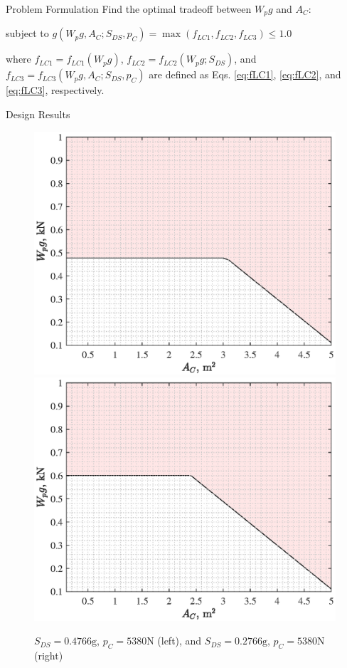 \documentclass[9pt]{beamer}
\begin{document}
	\begin{frame}{Problem Formulation}
	Find the optimal tradeoff between $W_pg$ and $A_C$:
	
	subject to $g(W_pg,A_C;S_{DS},p_C)=\max(f_{LC1},f_{LC2},f_{LC3})\leq 1.0$
	
	\noindent where $f_{LC1}=f_{LC1}(W_pg)$, $f_{LC2}=f_{LC2}(W_pg;S_{DS})$, and $f_{LC3}=f_{LC3}(W_pg, A_C;S_{DS}, p_C)$ are defined as Eqs. \eqref{eq:fLC1}, \eqref{eq:fLC2}, and \eqref{eq:fLC3}, respectively. 
	\end{frame}	
	\begin{frame}{Design Results}
		\begin{figure}
\includegraphics[height=.40\textheight]{Result01}
\includegraphics[height=.40\textheight]{Result02}
\caption{$S_{DS}=0.4766\mathrm g$, $p_C=5380\mathrm N$ (left), and $S_{DS}=0.2766\mathrm g$, $p_C=5380\mathrm N$ (right)}
\end{figure}	
	\end{frame}
\end{document}
